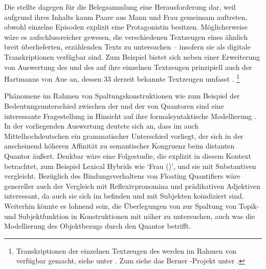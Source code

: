 Die \KC{} stellte dagegen für die Belegsammlung eine Herausforderung dar, weil
aufgrund ihres Inhalts kaum Paare aus Mann und Frau gemeinsam auftreten, obwohl
einzelne Episoden explizit eine Protagonistin besitzen. Möglicherweise wäre es
aufschlussreicher gewesen, die verschiedenen Textzeugen eines ähnlich breit
überlieferten, erzählenden Texts zu untersuchen -- insofern sie als digitale
Transkriptionen verfügbar sind. Zum Beispiel bietet sich
neben einer Erweiterung von  Auswertung des
 und des  auf ihre einzelnen Textzeugen prinzipiell
auch der  Hartmanns von Aue an, dessen  33
derzeit bekannte Textzeugen umfasst \autocites[vgl.][s.\,v.~\textit{Hartmann
von Aue: }]{hsc}.%
%
	\footnote{Transkriptionen der einzelnen Textzeugen des
		 werden im Rahmen von  verfügbar
		gemacht, siehe unter . Zum  siehe das
		Berner -Projekt unter .%
	}

Phänomene im Rahmen von Spaltungskonstruktionen wie zum Beispiel der
Bedeutungs\-unterschied zwischen der  und der
 von Quantoren sind eine interessante Fragestellung in
Hinsicht auf ihre formal\-syntaktische Modellierung \autocite[siehe
z.\,B.][]{pittner1995,merchant1996,fanselowcavar2002,nolda2007,shen2019}. In
der vorliegenden Auswertung deutete sich an, dass im auch
Mittelhochdeutschen ein grammatischer Unterschied
vorliegt, der sich in der anscheinend höheren Affinität zu semantischer
Kongruenz beim distanten Quantor äußert. Denkbar wäre eine Folgestudie, die
explizit   in diesem Kontext
betrachtet, zum Beispiel Lexical Hybrids wie 
`Frau (\NeutF)', und sie mit  Substantiven
vergleicht. Bezüglich des Bindungsverhaltens von Floating
Quantifiers wäre genereller auch der Vergleich mit
Reflexivpronomina und prädikativen
Adjektiven interessant, da auch sie sich im
 befinden und mit Subjekten koindiziert sind.
Weiterhin könnte es lohnend sein, die Überlegungen von \citet{spector2009} zur
Spaltung von Topik- und Subjektfunktion in Konstruktionen mit
 näher zu untersuchen, auch was die Modellierung des
Objektbezugs durch den Quantor betrifft.

